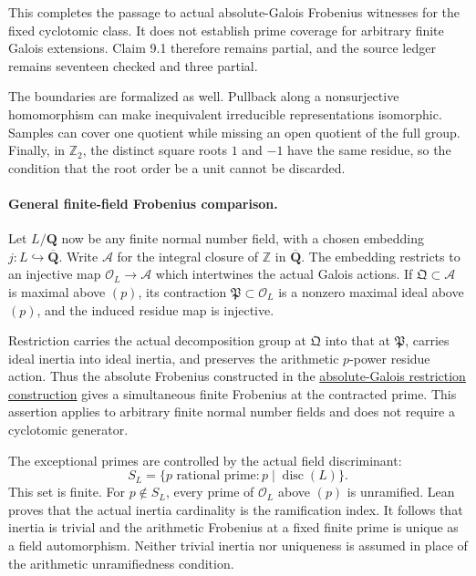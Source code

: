 \documentclass[11pt]{article}
\theoremstyle{definition}
\theoremstyle{remark}
\newcommand{\Q}{\mathbf Q}
\begin{document}
This completes the passage to actual absolute-Galois Frobenius witnesses for
the fixed cyclotomic class. It does not establish prime coverage for arbitrary
finite Galois extensions. Claim 9.1 therefore remains partial, and the
source ledger remains seventeen checked and three partial.

The boundaries are formalized as well. Pullback along a nonsurjective
homomorphism can make inequivalent irreducible representations isomorphic.
Samples can cover one quotient while missing an open quotient of the full
group. Finally, in $\mathbb Z_2$, the distinct square roots $1$ and $-1$ have
the same residue, so the condition that the root order be a unit cannot be
discarded.

\paragraph{General finite-field Frobenius comparison.}\label{book:x-construction-27}
Let $L/\Q$ now be any finite normal number field, with a chosen embedding
$j:L\hookrightarrow\overline{\Q}$. Write $\mathcal A$ for the integral
closure of $\mathbb Z$ in $\overline{\Q}$. The embedding restricts to an
injective map $\mathcal O_L\to\mathcal A$ which intertwines the actual
Galois actions. If $\mathfrak Q\subset\mathcal A$ is maximal above $(p)$,
its contraction $\mathfrak P\subset\mathcal O_L$ is a nonzero maximal
ideal above $(p)$, and the induced residue map is injective.

Restriction carries the actual decomposition group at $\mathfrak Q$ into
that at $\mathfrak P$, carries ideal inertia into ideal inertia, and
preserves the arithmetic $p$-power residue action. Thus the absolute
Frobenius constructed in the \hyperref[book:x-construction-26]{absolute-Galois restriction construction} gives a simultaneous finite Frobenius
at the contracted prime. This assertion applies to arbitrary finite normal
number fields and does not require a cyclotomic generator.

The exceptional primes are controlled by the actual field discriminant:
\[
 S_L=\{p\text{ rational prime}:p\mid\operatorname{disc}(L)\}.
\]
This set is finite. For $p\notin S_L$, every prime of $\mathcal O_L$
above $(p)$ is unramified. Lean proves that the actual inertia cardinality
is the ramification index. It follows that inertia is trivial and the
arithmetic Frobenius at a fixed finite prime is unique as a field
automorphism. Neither trivial inertia nor uniqueness is assumed in place
of the arithmetic unramifiedness condition.
\end{document}
